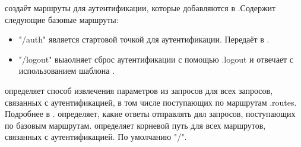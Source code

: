 \label{page-FPauth-core-module-FPauth+u+core-module-Router-module-Make-val-call}\begin{ocamlindent} создаёт маршруты для аутентификации, которые добавляются в .Содержит следующие базовые маршруты:\begin{itemize}\item{"/auth" является стартовой точкой для аутентификации. Передаёт  в \hyperref[page-FPauth-core-module-FPauth+u+core-module-Auth+u+sign-module-type-AUTHENTICATOR-val-authenticate]{}.}%
\item{"/logout" выаолняет сброс аутентификации с помощью .logout и отвечает с использованием шаблона \hyperref[page-FPauth-core-module-FPauth+u+core-module-Auth+u+sign-module-type-RESPONSES-val-logout]{}.}\end{itemize}%
 определяет способ извлечения параметров из запросов для всех запросов, связанных с аутентификацией, в том числе поступающих по маршрутам .routes. Подробнее в \hyperref[page-FPauth-core-module-FPauth+u+core-module-Static-module-Params-type-extractor]{}. определяет, какие ответы отправлять дял запросов, поступающих по базовым маршрутам. определяет корневой путь для всех маршрутов, связанных с аутентификацией. По умолчанию "/".\end{ocamlindent}%
\medbreak


